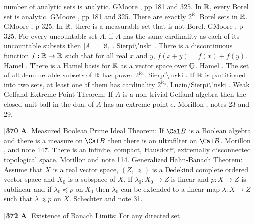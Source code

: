 number of analytic sets is analytic.  G\. \ac{Moore} \cite{1982},
pp 181 and 325.
\medskip
{} In $\Bbb R$, every Borel set is analytic.
G\. \ac{Moore} \cite{1982}, pp 181 and 325.
\medskip
{} There are exactly $2^{\aleph_0}$ Borel sets
in $\Bbb R$.  G\. \ac{Moore} \cite{1982}, p 325.
\medskip
{} In $\Bbb R$, there is a measurable set
that is not Borel.  G\. \ac{Moore} \cite{1982}, p 325.
\medskip
{}  For every uncountable set $A$, if $A$ has the
same cardinality as each of its uncountable subsets then
$|A| = \aleph_1$.  \ac{Sierpi\'nski} \cite{1918}.
\medskip
{}  There is a discontinuous function $f: \Bbb R
\to\Bbb R$ such that for all real $x$ and $y$, $f(x+y)=f(x)+f(y)$.
\ac{Hamel} \cite{1905}.
\medskip
{} There is a Hamel basis for $\Bbb R$ as a
vector space over $\Bbb Q$.  \ac{Hamel} \cite{1905}.
\medskip
{} The set of all denumerable subsets of
$\Bbb R$ has power $2^{\aleph_0}$.  \ac{Sierpi\'nski} \cite{1917}.
\medskip
{} If $\Bbb R$ is partitioned into two sets, at
least one of them has cardinality $2^{\aleph_0}$. \ac{Luzin/Sierpi\'nski}
\cite{1917}.
\medskip
{} Weak Gelfand Extreme Point Theorem: If $A$ is
a non-trivial Gelfand algebra then the closed unit ball in the dual
of $A$ has an extreme point $e$.  \ac{Morillon} \cite{1986}, notes 23 and
29.  
\smallskip
\item{}{\bf [370 A]} Measured Boolean Prime Ideal Theorem: If $\Cal B$
is a Boolean algebra and there is a measure on $\Cal B$ then there is
an ultrafilter on $\Cal B$.  \ac{Morillon} \cite{1989}, \cite{1990}
and note 147.
\medskip
{}  There is an infinite, compact, Hausdorff,
extremally disconnected topological space.  \ac{Morillon} \cite{1993}
and note 114.
\medskip
{} Generalized Hahn-Banach Theorem:  Assume that
$X$ is a real vector space, $(Z,\preccurlyeq)$ is a Dedekind
complete ordered vector space and $X_0$ is a subspace
of $X$.  If $\lambda_0 : X_0 \to Z$ is linear and
$p: X\to Z$ is sublinear and if $\lambda_0 \preccurlyeq p$
on $X_0$ then $\lambda_0$ can be extended to a linear map
$\lambda : X\to Z$ such that $\lambda \preccurlyeq p$ on $X$.
\ac{Schechter} \cite{1996b} and note 31. 
\smallskip
\item{}{\bf [372 A]} Existence of Banach Limits:  For any directed set
